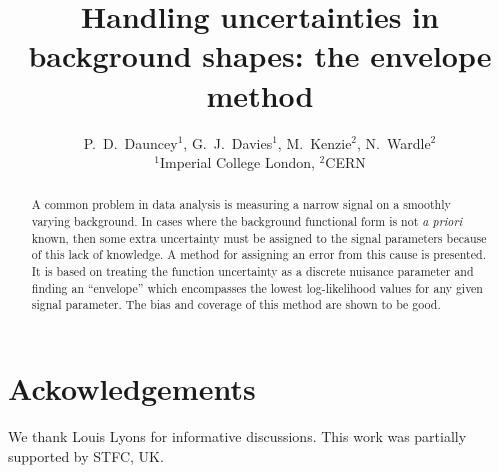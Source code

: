 \documentclass[11pt,a4paper]{article}
\begin{document}
\title{
\Large \bf Handling uncertainties in background shapes: the envelope method}
\author{P.~D.~Dauncey$^1$, G.~J.~Davies$^1$, M.~Kenzie$^2$, N.~Wardle$^2$\\
$^1$Imperial College London, $^2$CERN}

\maketitle

\begin{abstract}
A common problem in data analysis is measuring a narrow signal on a smoothly
varying background. In cases where the background functional form is not
{\it a priori} known, then some extra uncertainty must be assigned to the
signal parameters because of this lack of knowledge.
A method for assigning an error from this cause is presented. It is based on
treating the function uncertainty as a discrete nuisance parameter and finding
an ``envelope'' which encompasses the lowest log-likelihood values for any given
signal parameter. The bias and coverage of this method are shown to be good.
\end{abstract}

\tableofcontents
\newpage








\section{Ackowledgements}
We thank Louis Lyons for informative discussions. This work was partially
supported by STFC, UK.


\end{document}
